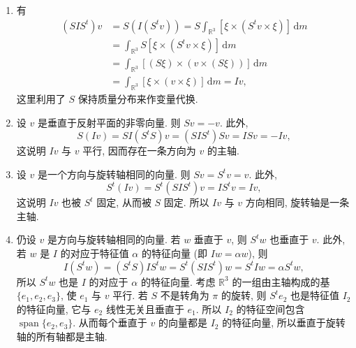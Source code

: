 \begin{description}[font=\normalfont,leftmargin=2em,labelwidth=1.5em]
\begin{enumerate}[label=(\alph*),ref=\alph*,leftmargin=*]
\item 有
\begin{align*}
  (SIS^t)v&=S(I(S^tv))=S\int_{\mathbb{R}^3}[\xi\times(S^tv\times\xi)]\,\mathrm{d}m\\
          &=\int_{\mathbb{R}^3}S[\xi\times(S^tv\times\xi)]\,\mathrm{d}m\\
          &=\int_{\mathbb{R}^3}[(S\xi)\times(v\times(S\xi))]\,\mathrm{d}m\\
          &=\int_{\mathbb{R}^3}[\xi\times(v\times\xi)]\,\mathrm{d}m=Iv,
\end{align*}
这里利用了 $S$ 保持质量分布来作变量代换.
\item 设 $v$ 是垂直于反射平面的非零向量. 则 $Sv=-v$. 此外,
\[
  S(Iv)=SI(S^tS)v=(SIS^t)Sv=ISv=-Iv,
\]
这说明 $Iv$ 与 $v$ 平行, 因而存在一条方向为 $v$ 的主轴.
\item 设 $v$ 是一个方向与旋转轴相同的向量. 则 $Sv=S^tv=v$. 此外,
\[
  S^t(Iv)=S^t(SIS^t)v=IS^tv=Iv,
\]
这说明 $Iv$ 也被 $S^t$ 固定, 从而被 $S$ 固定. 所以 $Iv$ 与 $v$ 方向相同, 旋转轴是一条主轴.
\item 仍设 $v$ 是方向与旋转轴相同的向量. 若 $w$ 垂直于 $v$, 则 $S^tw$ 也垂直于 $v$. 此外, 若 $w$ 是 $I$ 的对应于特征值 $\alpha$ 的特征向量 (即 $Iw=\alpha w$), 则
\[
  I(S^tw)=(S^tS)IS^tw=S^t(SIS^t)w=S^tIw=\alpha S^tw,
\]
所以 $S^tw$ 也是 $I$ 的对应于 $\alpha$ 的特征向量. 考虑 $\mathbb{R}^3$ 的一组由主轴构成的基 $\{e_1,e_2,e_3\}$, 使 $e_1$ 与 $v$ 平行. 若 $S$ 不是转角为 $\pi$ 的旋转, 则 $S^te_2$ 也是特征值 $I_2$ 的特征向量, 它与 $e_2$ 线性无关且垂直于 $e_1$. 所以 $I_2$ 的特征空间包含 $\operatorname{span}\{e_2,e_3\}$. 从而每个垂直于 $v$ 的向量都是 $I_2$ 的特征向量, 所以垂直于旋转轴的所有轴都是主轴.
\end{enumerate}


\end{description}
